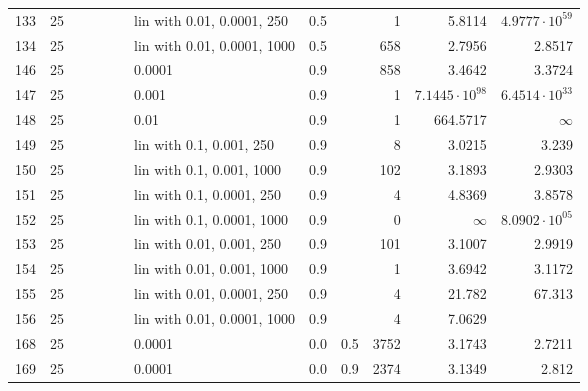 \begin{longtable}{lrrrrrlrrrrr}
 133 &      25 &   &   &   &   &  lin with 0.01, 0.0001, 250 &  0.5 &        &       1 &                 5.8114 &  $4.9777\cdot 10^{59}$ \\
 134 &      25 &   &   &   &   & lin with 0.01, 0.0001, 1000 &  0.5 &        &     658 &                 2.7956 &                 2.8517 \\
 146 &      25 &   &   &   &   &                      0.0001 &  0.9 &        &     858 &                 3.4642 &                 3.3724 \\
 147 &      25 &   &   &   &   &                       0.001 &  0.9 &        &       1 &  $7.1445\cdot 10^{98}$ &  $6.4514\cdot 10^{33}$ \\
 148 &      25 &   &   &   &   &                        0.01 &  0.9 &        &       1 &               664.5717 &               $\infty$ \\
 149 &      25 &   &   &   &   &    lin with 0.1, 0.001, 250 &  0.9 &        &       8 &                 3.0215 &                  3.239 \\
 150 &      25 &   &   &   &   &   lin with 0.1, 0.001, 1000 &  0.9 &        &     102 &                 3.1893 &                 2.9303 \\
 151 &      25 &   &   &   &   &   lin with 0.1, 0.0001, 250 &  0.9 &        &       4 &                 4.8369 &                 3.8578 \\
 152 &      25 &   &   &   &   &  lin with 0.1, 0.0001, 1000 &  0.9 &        &       0 &               $\infty$ &  $8.0902\cdot 10^{05}$ \\
 153 &      25 &   &   &   &   &   lin with 0.01, 0.001, 250 &  0.9 &        &     101 &                 3.1007 &                 2.9919 \\
 154 &      25 &   &   &   &   &  lin with 0.01, 0.001, 1000 &  0.9 &        &       1 &                 3.6942 &                 3.1172 \\
 155 &      25 &   &   &   &   &  lin with 0.01, 0.0001, 250 &  0.9 &        &       4 &                 21.782 &                 67.313 \\
 156 &      25 &   &   &   &   & lin with 0.01, 0.0001, 1000 &  0.9 &        &       4 &                 7.0629 &                        \\
 168 &      25 &   &   &   &   &                      0.0001 &  0.0 &    0.5 &    3752 &                 3.1743 &                 2.7211 \\
 169 &      25 &   &   &   &   &                      0.0001 &  0.0 &    0.9 &    2374 &                 3.1349 &                  2.812 \\

\end{longtable}
